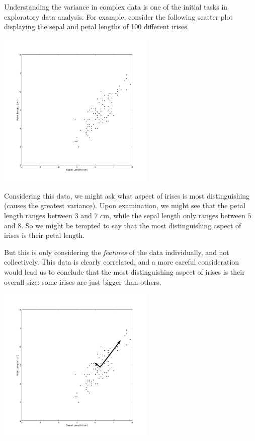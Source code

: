 


Understanding the variance in complex data is one of the initial tasks in exploratory data analysis. For example, consider the following scatter plot displaying the sepal and petal lengths of 100 different irises.

\begin{center}
\includegraphics[width=7.5cm]{iris0.jpg}
\end{center}

Considering this data, we might ask what aspect of irises is most distinguishing (causes the greatest variance). Upon examination, we might see that the petal length ranges between $3$ and $7$ cm, while the sepal length only ranges between $5$ and $8$. So we might be tempted to say that the most distinguishing aspect of irises is their petal length.

But this is only considering the \emph{features} of the data individually, and not collectively. This data is clearly correlated, and a more careful consideration would lead us to conclude that the most distinguishing aspect of irises is their overall size: some irises are just bigger than others.

\begin{center}
\includegraphics[width=7.5cm]{iris2.jpg}
\end{center}

